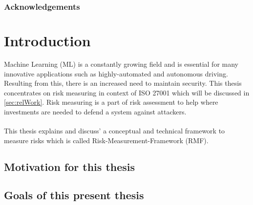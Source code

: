 \begin{abstract}

\end{abstract}

\subsubsection*{Acknowledgements}

\newpage

\section{Introduction}
\label{sec:intro}

Machine Learning (ML) is a constantly growing field and is essential for many innovative
applications such as highly-automated and autonomous driving. Resulting from this,
there is an increased need to maintain security. This thesis concentrates on risk
measuring in context of ISO 27001 which will be discussed in \ref{sec:relWork}. Risk
measuring is a part of risk assessment to help where investments are needed to
defend a system against attackers. \\ \\
This thesis explains and discuss' a conceptual and technical framework to measure
risks which is called Risk-Measurement-Framework (RMF).

\subsection{Motivation for this thesis}

\subsection{Goals of this present thesis}
